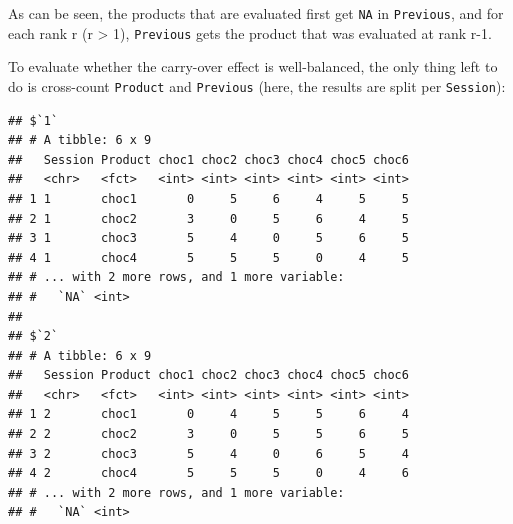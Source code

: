 \documentclass[
]{krantz}
\makeatletter
\newenvironment{Shaded}{\begin{snugshade}}{\end{snugshade}}
\newcommand{\AttributeTok}[1]{\textcolor[rgb]{0.61,0.61,0.61}{#1}}
\newcommand{\DecValTok}[1]{\textcolor[rgb]{0.06,0.06,0.06}{#1}}
\newcommand{\FunctionTok}[1]{\textcolor[rgb]{0,0,0}{#1}}
\newcommand{\NormalTok}[1]{#1}
\newcommand{\SpecialCharTok}[1]{\textcolor[rgb]{0,0,0}{#1}}
\newcommand{\StringTok}[1]{\textcolor[rgb]{0.5,0.5,0.5}{#1}}
\newenvironment{kframe}{%
\medskip{}
\setlength{\fboxsep}{.8em}
 \def\at@end@of@kframe{}%
 \ifinner\ifhmode%
  \def\at@end@of@kframe{\end{minipage}}%
  \begin{minipage}{\columnwidth}%
 \fi\fi%
 \def\FrameCommand##1{\hskip\@totalleftmargin \hskip-\fboxsep
 \colorbox{shadecolor}{##1}\hskip-\fboxsep
     \hskip-\linewidth \hskip-\@totalleftmargin \hskip\columnwidth}%
 \MakeFramed {\advance\hsize-\width
   \@totalleftmargin\z@ \linewidth\hsize
   \@setminipage}}%
 {\par\unskip\endMakeFramed%
 \at@end@of@kframe}
\renewenvironment{Shaded}{\begin{kframe}}{\end{kframe}}
\makeatother
\begin{document}
As can be seen, the products that are evaluated first get \texttt{NA} in \texttt{Previous}, and for each rank r (r \textgreater{} 1), \texttt{Previous} gets the product that was evaluated at rank r-1.

To evaluate whether the carry-over effect is well-balanced, the only thing left to do is cross-count \texttt{Product} and \texttt{Previous} (here, the results are split per \texttt{Session}):

\begin{Shaded}
\end{Shaded}

\begin{verbatim}
## $`1`
## # A tibble: 6 x 9
##   Session Product choc1 choc2 choc3 choc4 choc5 choc6
##   <chr>   <fct>   <int> <int> <int> <int> <int> <int>
## 1 1       choc1       0     5     6     4     5     5
## 2 1       choc2       3     0     5     6     4     5
## 3 1       choc3       5     4     0     5     6     5
## 4 1       choc4       5     5     5     0     4     5
## # ... with 2 more rows, and 1 more variable:
## #   `NA` <int>
## 
## $`2`
## # A tibble: 6 x 9
##   Session Product choc1 choc2 choc3 choc4 choc5 choc6
##   <chr>   <fct>   <int> <int> <int> <int> <int> <int>
## 1 2       choc1       0     4     5     5     6     4
## 2 2       choc2       3     0     5     5     6     5
## 3 2       choc3       5     4     0     6     5     4
## 4 2       choc4       5     5     5     0     4     6
## # ... with 2 more rows, and 1 more variable:
## #   `NA` <int>
\end{verbatim}
\end{document}
